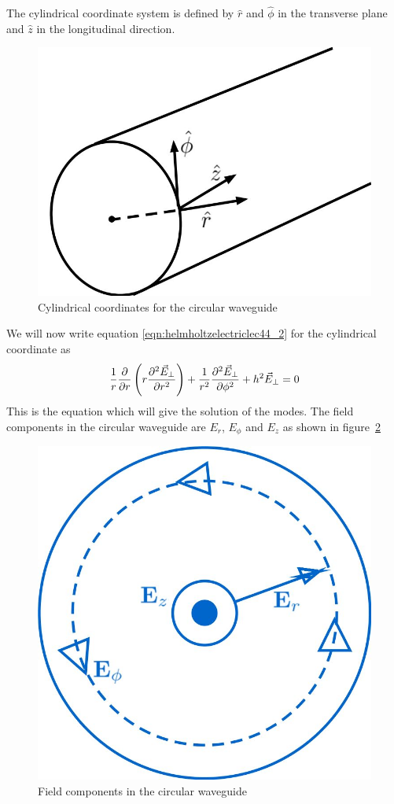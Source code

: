 The cylindrical coordinate system is defined by $\hat{r}$ and $\hat{\phi}$ in the transverse plane and $\hat{z}$ in the longitudinal direction.
\begin{figure}[h]
\centering
\includegraphics[width=0.7\linewidth]{./graphics/fig_4.1}
\caption{Cylindrical coordinates for the circular waveguide}
\label{fig:fig4}
\end{figure}

We will now write equation \ref{eqn:helmholtzelectriclec44_2} for the cylindrical coordinate as 
\begin{align}
\frac{1}{r}\partialderivative{}{r}\left(r\partialderivative[2]{\vec{E}_\bot}{r}\right) + \frac{1}{r^2}\partialderivative[2]{\vec{E}_\bot}{\phi}+ h^2\vec{E}_\bot = 0 
\label{eqn:cylindricalequation}   
\end{align}
This is the equation which will give the solution of the modes. The field components in the circular waveguide are $E_r$, $E_\phi$ and $E_z$ as shown in figure~\ref{fig:fig5}
\begin{figure}[h]
\centering
\includegraphics[width=0.5\linewidth]{./graphics/fig_5.1}
\caption{Field components in the circular waveguide}
\label{fig:fig5}
\end{figure}

